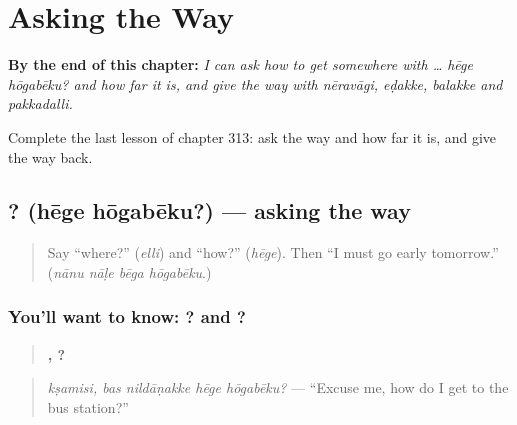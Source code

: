 
\chapter{Asking the Way}
\label{ch:ka-asking-the-way}

\begin{chapteropening}
\textbf{By the end of this chapter:} \emph{I can ask how to get somewhere with … hēge hōgabēku? and how far it is, and give the way with nēravāgi, eḍakke, balakke and pakkadalli.}

Complete the last lesson of chapter 313: ask the way and how far it is, and give the way back.
\end{chapteropening}

\section[\texorpdfstring{\kn{ಹೇಗೆ} \kn{ಹೋಗಬೇಕು}? (hēge hōgabēku?)}{ಹೇಗೆ ಹೋಗಬೇಕು? (hēge hōgabēku?)}]{ ? (hēge hōgabēku?) — asking the way}

\label{lesson:KA-C313-hege-hogabeku}



\begin{quote}
Say \textquotedblleft{}where?\textquotedblright{} (\emph{elli}) and \textquotedblleft{}how?\textquotedblright{} (\emph{hēge}). Then \textquotedblleft{}I must go early tomorrow.\textquotedblright{} (\emph{nānu nāḷe bēga hōgabēku}.)
\end{quote}

\subsection*{You'll want to know:  ? and ?}
\begin{quote}
\textbf{,    ?}
\end{quote}

\begin{quote}
\emph{kṣamisi, bas nildāṇakke hēge hōgabēku?} — \textquotedblleft{}Excuse me, how do I get to the bus station?\textquotedblright{}
\end{quote}


